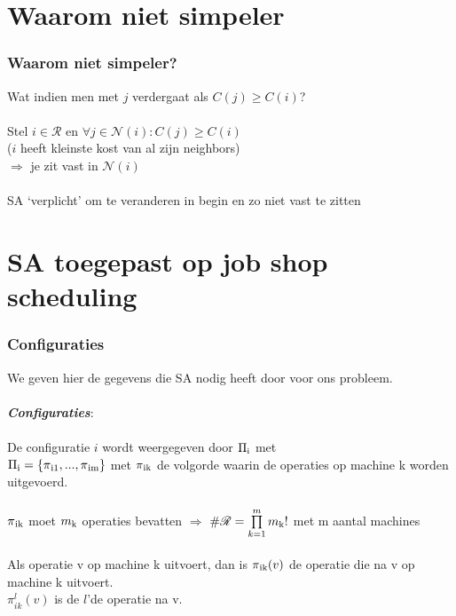 \documentclass
   [kulak] %
   {kulakbeamer}
\begin{document}
\section[simpeler?]{Waarom niet simpeler}

\begin{frame}
	\frametitle{Waarom niet simpeler?}
	Wat indien men met $j$ verdergaat als $C(j) \geqslant C(i)$?\\~\\
	\pause
	Stel $i \in \mathscr{R}$ en $\forall j \in \mathscr{N}(i): C(j) \geqslant C(i)$ \\($i$ heeft kleinste kost van al zijn neighbors) \\
	$\Rightarrow$ je zit vast in $\mathscr{N}(i)$ \\~\\
	\pause
	SA `verplicht' om te veranderen in begin en zo niet vast te zitten
\end{frame}

\section[SA job shop]{SA toegepast op job shop scheduling}

\begin{frame}
	\frametitle{Configuraties}
	We geven hier de gegevens die SA nodig heeft door voor ons probleem.\pause 
	~\\~\\  \textbf{\textit{Configuraties}}: \\ ~\\
	De configuratie $i$ wordt weergegeven door $\Pi\textsubscript{i}$ met \\ $\Pi\textsubscript{i} = \{\pi\textsubscript{i1}, ... ,\pi\textsubscript{im}\}$
	met $\pi\textsubscript{ik}$ de volgorde waarin de operaties op machine k worden uitgevoerd.
	 \pause	~\\~\\ $\pi\textsubscript{ik}$ moet $m\textsubscript{k}$ operaties bevatten $\Rightarrow$ $\#\mathscr{R} = \prod\limits_{k=1}^m m\textsubscript{k}!$ met m aantal machines \\~\\ Als operatie v op machine k uitvoert, dan is $\pi\textsubscript{ik}(v)$ de operatie die na v op machine k uitvoert.\\
	 $\pi_{ik}^l (v)$ is de $l$'de operatie na v.

\end{frame}
\end{document}
